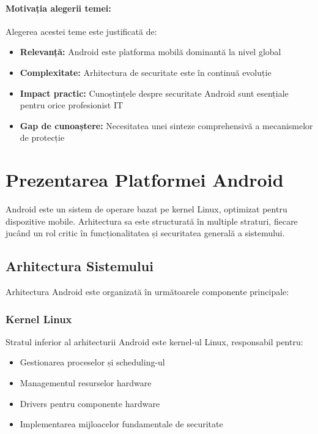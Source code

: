 \documentclass[11pt,a4paper,twocolumn]{article}
\theoremstyle{definition}
\theoremstyle{plain}
\theoremstyle{remark}
\begin{document}
\paragraph{Motivația alegerii temei:}
Alegerea acestei teme este justificată de:
\begin{itemize}
    \item \textbf{Relevanță:} Android este platforma mobilă dominantă la nivel global
    \item \textbf{Complexitate:} Arhitectura de securitate este în continuă evoluție
    \item \textbf{Impact practic:} Cunoștințele despre securitate Android sunt esențiale pentru orice profesionist IT
    \item \textbf{Gap de cunoaștere:} Necesitatea unei sinteze comprehensivă a mecanismelor de protecție
\end{itemize}

\section{Prezentarea Platformei Android}

Android este un sistem de operare bazat pe kernel Linux, optimizat pentru dispozitive mobile. 
Arhitectura sa este structurată în multiple straturi, fiecare jucând un rol critic în 
funcționalitatea și securitatea generală a sistemului.

\subsection{Arhitectura Sistemului}

Arhitectura Android este organizată în următoarele componente principale:

\subsubsection{Kernel Linux}
Stratul inferior al arhitecturii Android este kernel-ul Linux, responsabil pentru:
\begin{itemize}
    \item Gestionarea proceselor și scheduling-ul
    \item Managementul resurselor hardware
    \item Drivers pentru componente hardware
    \item Implementarea mijloacelor fundamentale de securitate
\end{itemize}
\end{document}
